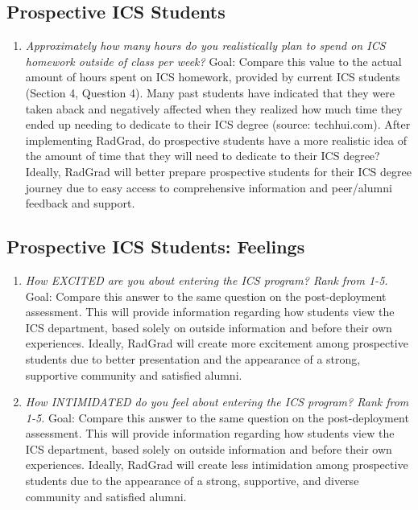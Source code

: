 \subsection{Prospective ICS Students}
\begin{enumerate}
\item \textit{Approximately how many hours do you realistically plan to spend on ICS homework outside of class per week?}
Goal: Compare this value to the actual amount of hours spent on ICS homework, provided by current ICS students (Section 4, Question 4). Many past students have indicated that they were taken aback and negatively affected when they realized how much time they ended up needing to dedicate to their ICS degree (source: techhui.com). After implementing RadGrad, do prospective students have a more realistic idea of the amount of time that they will need to dedicate to their ICS degree? Ideally, RadGrad will better prepare prospective students for their ICS degree journey due to easy access to comprehensive information and peer/alumni feedback and support.
\end{enumerate}

\subsection{Prospective ICS Students: Feelings}
\begin{enumerate}
\item\textit{ How EXCITED are you about entering the ICS program? Rank from 1-5.}
Goal: Compare this answer to the same question on the post-deployment assessment.  This will provide information regarding how students view the ICS department, based solely on outside information and before their own experiences. Ideally, RadGrad will create more excitement among prospective students due to better presentation and the appearance of a strong, supportive community and satisfied alumni.
\item \textit{How INTIMIDATED do you feel about entering the ICS program? Rank from 1-5.}
Goal: Compare this answer to the same question on the post-deployment assessment.  This will provide information regarding how students view the ICS department, based solely on outside information and before their own experiences. Ideally, RadGrad will create less intimidation among prospective students due to the appearance of a strong, supportive, and diverse community and satisfied alumni. 
\end{enumerate}

